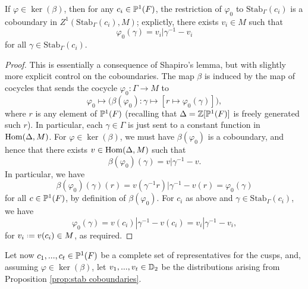 \documentclass[a4paper,10pt]{article}
\numberwithin{equation}{section}
\begin{document}
\begin{proposition}\label{prop:stab coboundaries}
If $\varphi \in \ker(\beta)$, then for any $c_i \in \mathbb{P}^1(F)$, the restriction of $\varphi_0$ to $\mathrm{Stab}_\Gamma(c_i)$ is a coboundary in $Z^1(\mathrm{Stab}_\Gamma(c_i),M)$; explictly, there exists $v_i \in M$ such that
\[
	\varphi_0(\gamma) = v_i|\gamma^{-1} - v_i
\]
for all $\gamma \in \mathrm{Stab}_\Gamma(c_i)$.
\end{proposition}
\begin{proof}
	This is essentially a consequence of Shapiro's lemma, but with slightly more explicit control on the coboundaries. The map $\beta$ is induced by the map of cocycles that sends the cocycle $\varphi_0 : \Gamma \to M$ to
	\[
		\varphi_0 \longmapsto \bigg(\beta\left(\varphi_0\right) : \gamma \mapsto \left[r \mapsto \varphi_0(\gamma)\right]\bigg),
	\]
	where $r$ is any element of $\mathbb{P}^1(F)$ (recalling that $\Delta = \mathbb{Z}[\mathbb{P}^1(F)]$ is freely generated such $r$). In particular, each $\gamma \in \Gamma$ is just sent to a constant function in $\mathrm{Hom}(\Delta,M)$. For $\varphi \in \ker(\beta)$, we must have $\beta(\varphi_0)$ is a coboundary, and hence that there exists $v \in \mathrm{Hom}(\Delta,M)$ such that 
	\[
		\beta(\varphi_0)(\gamma) = v|\gamma^{-1} - v.
	\]
	In particular, we have 
	\[
		\beta(\varphi_0)(\gamma)(r) = v(\gamma^{-1} r)|\gamma^{-1} - v(r) = \varphi_0(\gamma)
	\]
	for all $c \in \mathbb{P}^1(F)$, by definition of $\beta(\varphi_0)$. For $c_i$ as above and $\gamma \in \mathrm{Stab}_\Gamma(c_i)$, we have
	\[
		\varphi_0(\gamma) = v(c_i)|\gamma^{-1} - v(c_i) = v_i|\gamma^{-1} - v_i,
	\]
	for $v_i \defeq v(c_i) \in M$, as required.
\end{proof}

Let now $c_1, ..., c_t \in \mathbb{P}^1(F)$ be a complete set of representatives for the cusps, and, assuming $\varphi \in \ker(\beta)$, let $v_1, ..., v_t \in \mathbb{D}_2$ be the distributions arising from Proposition \ref{prop:stab coboundaries}.
		

\end{document}
